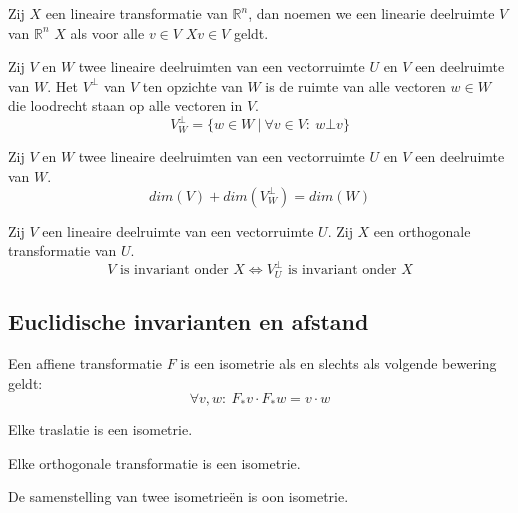 \documentclass[main.tex]{subfiles}
\begin{document}
\begin{de}
  Zij $X$ een lineaire transformatie van $\mathbb{R}^{n}$, dan noemen we een linearie deelruimte $V$ van $\mathbb{R}^{n}$  $X$ als voor alle $v\in V$ $Xv \in V$ geldt.
\end{de}

\begin{de}
  Zij $V$ en $W$ twee lineaire deelruimten van een vectorruimte $U$ en $V$ een deelruimte van $W$.
  Het  $V^{\bot}$ van $V$ ten opzichte van $W$ is de ruimte van alle vectoren $w\in W$ die loodrecht staan op alle vectoren in $V$.
  \[ V^{\bot}_{W} = \{ w \in W\ |\ \forall v \in V:\ w \bot v \} \]
\end{de}

\begin{st}
  Zij $V$ en $W$ twee lineaire deelruimten van een vectorruimte $U$ en $V$ een deelruimte van $W$.
  \[ dim(V) + dim(V^{\bot}_{W}) = dim(W) \]
\end{st}

\begin{st}
  Zij $V$ een lineaire deelruimte van een vectorruimte $U$.
  Zij $X$ een orthogonale transformatie van $U$.
  \[ V \text{ is invariant onder } X \Leftrightarrow V^{\bot}_{U} \text{ is invariant onder } X \]
\end{st}

\subsection{Euclidische invarianten en afstand}
\label{sec:eucl-invar-en}

\begin{st}
  Een affiene transformatie $F$ is een isometrie als en slechts als volgende bewering geldt:
  \[ \forall v,w:\ F_{*}v \cdot F_{*}w = v \cdot w \]
\end{st}

\begin{st}
  Elke traslatie is een isometrie.
\end{st}

\begin{st}
  Elke orthogonale transformatie is een isometrie.
\end{st}

\begin{st}
  De samenstelling van twee isometrie\"en is oon isometrie.
\end{st}
\end{document}
